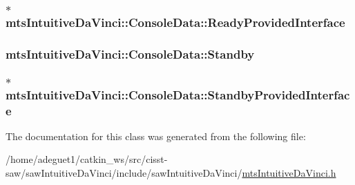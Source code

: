 \hypertarget{classmts_intuitive_da_vinci_1_1_console_data_a38357629dbf987f86a238edf04235ace}{
\subsubsection[{Ready\-Provided\-Interface}]{$\ast$ mts\-Intuitive\-Da\-Vinci\-::\-Console\-Data\-::\-Ready\-Provided\-Interface}}\label{classmts_intuitive_da_vinci_1_1_console_data_a38357629dbf987f86a238edf04235ace}
\hypertarget{classmts_intuitive_da_vinci_1_1_console_data_ac4e3b3234430ebffecd42aa75f26c1d9}{
\subsubsection[{Standby}]{ mts\-Intuitive\-Da\-Vinci\-::\-Console\-Data\-::\-Standby}}\label{classmts_intuitive_da_vinci_1_1_console_data_ac4e3b3234430ebffecd42aa75f26c1d9}
\hypertarget{classmts_intuitive_da_vinci_1_1_console_data_a42526431899b8d287072e9db9a7f6e0e}{
\subsubsection[{Standby\-Provided\-Interface}]{$\ast$ mts\-Intuitive\-Da\-Vinci\-::\-Console\-Data\-::\-Standby\-Provided\-Interface}}\label{classmts_intuitive_da_vinci_1_1_console_data_a42526431899b8d287072e9db9a7f6e0e}


The documentation for this class was generated from the following file\-:\begin{DoxyCompactItemize}
\item 
/home/adeguet1/catkin\-\_\-ws/src/cisst-\/saw/saw\-Intuitive\-Da\-Vinci/include/saw\-Intuitive\-Da\-Vinci/\hyperlink{mts_intuitive_da_vinci_8h}{mts\-Intuitive\-Da\-Vinci.\-h}\end{DoxyCompactItemize}
